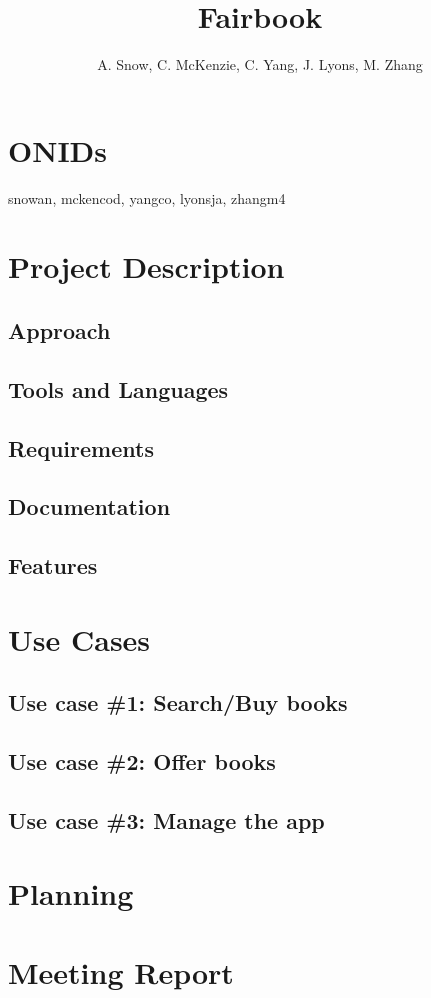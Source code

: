 \documentclass[12pt]{article}
\title{Fairbook}
\author{A. Snow, C. McKenzie, C. Yang, J. Lyons, M. Zhang}
\begin{document}
	\maketitle
	
	\tableofcontents
		\section{ONIDs}
		snowan, mckencod, yangco, lyonsja, zhangm4


	\section{Project Description}

		\subsection{Approach}


		\subsection{Tools and Languages}


		\subsection{Requirements}


		\subsection{Documentation}


		\subsection{Features}



	\section{Use Cases}

		\subsection{Use case \#1: Search/Buy books}




		\subsection{Use case \#2: Offer books}



		\subsection{Use case \#3: Manage the app}



		


	\section{Planning}



	\section{Meeting Report}
\end{document}
